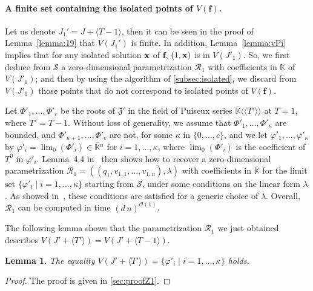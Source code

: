 \documentclass[11pt]{article}
\numberwithin{Property}{section}
\numberwithin{Theorem}{section}
\numberwithin{Proposition}{section}
\newtheorem{Lemma}{Lemma}%
\numberwithin{Lemma}{section}
\numberwithin{Corollary}{section}
\numberwithin{Definition}{section}
\numberwithin{Remark}{section}
\numberwithin{Conjecture}{section}
\numberwithin{Problem}{section}
\numberwithin{Claim}{section}
\theoremstyle{definition}
\numberwithin{Example}{section}
\def\f {\ensuremath{\mathbf{f}}}
\def\bar{\overline}
\newcommand{\field}{\mathbb{K}} %
\newcommand{\improve}[1]{\textcolor{blue}{#1}} %
\begin{document}
\paragraph{A finite set containing the isolated points of $V(\f)$.} Let us denote $J_1' = J + \langle T -1 \rangle$, then it can be seen in the proof of Lemma~\ref{lemma:19} that $V(J_1')$ is finite. In addition, Lemma~\ref{lemma:vPi} implies that for any isolated solution ${\bf x}$ of $\f$, $(1,{\bf x})$ is in $V(J'_1)$. So, we first deduce from $\mathscr{S}$ a zero-dimensional parametrization $\mathscr{R}_1$ with coefficients in $\field$
of $V(J'_1)$; and then by using the algorithm of \improve{\cref{subsec:isolated}}, we discard from $V(J'_1)$ those points that do not correspond to isolated points of $V(\f)$. 

Let $\Phi'_1,\dots,\Phi'_c$ be the roots of $\mathfrak{J}'$ in the field of Puiseux series $\bar{\field}\langle\langle T'\rangle\rangle$ at $T=1$, where $T' = T-1$. Without loss of generality, we assume that
$\Phi'_1,\dots,\Phi'_\kappa$ are bounded, and
$\Phi'_{\kappa+1},\dots,\Phi'_c$ are not, for some $\kappa$ in
$\{0,\dots,c\}$, and we let $\varphi'_1,\dots,\varphi'_\kappa$ by
$\varphi'_i=\lim_0(\Phi'_i)\in\bar{\field}{}^n$ for
$i=1,\dots,\kappa$, where $\lim_0(\Phi'_i)$ is the coefficient of $T^0$ in $\varphi'_i$. Lemma~4.4 in~\cite{RRS} then shows how to recover a zero-dimensional parametrization
$\mathscr{R}_1=((q_1,v_{1,1},\dots,v_{1,n}),\lambda)$ with coefficients in
$\field$ for the limit set $\{\varphi'_i \mid i=1,\dots,\kappa\}$
starting from $\mathscr{S}$, under some conditions on the linear form
$\lambda$. As showed in~\cite{SaSc16}, these conditions are satisfied for a generic choice
of $\lambda$. Overall, $\mathscr{R}_1$ can be computed in time $(d\,n)^{\mathcal{O}(1)}$.

The following lemma shows that the parametrization $\mathscr{R}_1$ we just obtained 
describes $V(J' + \langle T' \rangle)=V(J' + \langle T-1 \rangle)$.

\begin{Lemma}\label{lemma:Z1}
  The equality $V(J' +\langle T' \rangle)=\{\varphi'_i \mid i=1,\dots,\kappa\}$ holds.
\end{Lemma}
\begin{proof}
The proof is given in \improve{\cref{sec:proofZ1}}. 
\end{proof}
\end{document}
